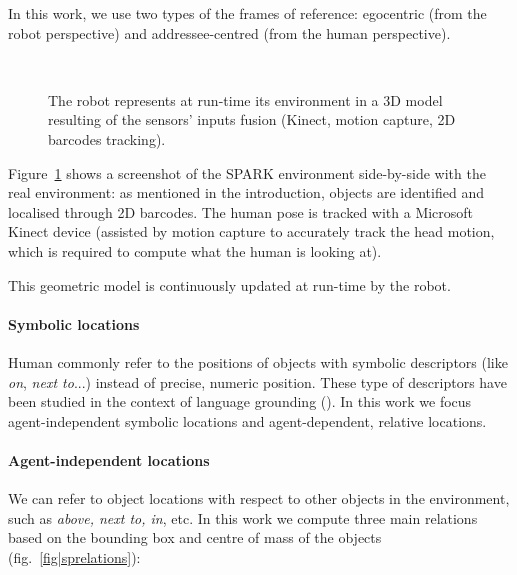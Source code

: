 In this work, we use two types of the frames of reference: egocentric (from the
robot perspective) and addressee-centred (from the human perspective).

\begin{figure}[ht!]
   \begin{center}
%
       \\ %
%
   \end{center}

   \caption{The robot represents at run-time its environment in a 3D model
   resulting of the sensors' inputs fusion (Kinect, motion capture, 2D barcodes
   tracking).}

   \label{fig|spark}

\end{figure}

Figure~\ref{fig|spark} shows a screenshot of the SPARK environment side-by-side
with the real environment: as mentioned in the introduction, objects are
identified and localised through 2D barcodes. The human pose is tracked with
a Microsoft Kinect device (assisted by motion capture to accurately track the
head motion, which is required to compute what the human is looking at).

This geometric model is continuously updated at run-time by the robot.

\paragraph{Symbolic locations}

Human commonly refer to the positions of objects with symbolic descriptors
(like \emph{on}, \emph{next to}...) instead of precise, numeric position. These
type of descriptors have been studied in the context of language grounding
(\cite{O'Keefe1999,Matuszek2010,Regier2001,Kelleher2006,Blisard2005}). In this
work we focus agent-independent symbolic locations and agent-dependent,
relative locations.

\paragraph{Agent-independent locations}

We can refer to object locations with respect to other objects in the
environment, such as \emph{above, next to, in}, etc. In this work we compute
three main relations based on the bounding box and centre of mass of the
objects (fig.~\ref{fig|sprelations}): 

